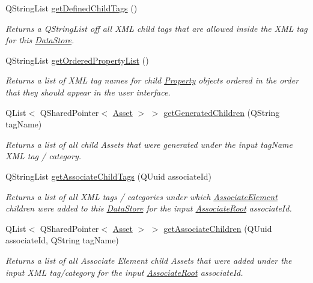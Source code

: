 \begin{DoxyCompactItemize}
Q\-String\-List \hyperlink{class_picto_1_1_data_store_a0f04316d9bbf1e07a737bd026556968e}{get\-Defined\-Child\-Tags} ()
\begin{DoxyCompactList}\small\item\em Returns a Q\-String\-List off all X\-M\-L child tags that are allowed inside the X\-M\-L tag for this \hyperlink{class_picto_1_1_data_store}{Data\-Store}. \end{DoxyCompactList}\item 
Q\-String\-List \hyperlink{class_picto_1_1_data_store_a6ead7a2e1b55e03cb3e5d14934962436}{get\-Ordered\-Property\-List} ()
\begin{DoxyCompactList}\small\item\em Returns a list of X\-M\-L tag names for child \hyperlink{class_picto_1_1_property}{Property} objects ordered in the order that they should appear in the user interface. \end{DoxyCompactList}\item 
Q\-List$<$ Q\-Shared\-Pointer$<$ \hyperlink{class_picto_1_1_asset}{Asset} $>$ $>$ \hyperlink{class_picto_1_1_data_store_ab7a53abb547d95df318bd9b47db1abf6}{get\-Generated\-Children} (Q\-String tag\-Name)
\begin{DoxyCompactList}\small\item\em Returns a list of all child Assets that were generated under the input tag\-Name X\-M\-L tag / category. \end{DoxyCompactList}\item 
Q\-String\-List \hyperlink{class_picto_1_1_data_store_a6f1853bb25faa31f63002d882e293173}{get\-Associate\-Child\-Tags} (Q\-Uuid associate\-Id)
\begin{DoxyCompactList}\small\item\em Returns a list of all X\-M\-L tags / categories under which \hyperlink{class_picto_1_1_associate_element}{Associate\-Element} children were added to this \hyperlink{class_picto_1_1_data_store}{Data\-Store} for the input \hyperlink{class_picto_1_1_associate_root}{Associate\-Root} associate\-Id. \end{DoxyCompactList}\item 
Q\-List$<$ Q\-Shared\-Pointer$<$ \hyperlink{class_picto_1_1_asset}{Asset} $>$ $>$ \hyperlink{class_picto_1_1_data_store_a8b9c70f5ab91278d774249654396b6bd}{get\-Associate\-Children} (Q\-Uuid associate\-Id, Q\-String tag\-Name)
\begin{DoxyCompactList}\small\item\em Returns a list of all Associate Element child Assets that were added under the input X\-M\-L tag/category for the input \hyperlink{class_picto_1_1_associate_root}{Associate\-Root} associate\-Id. \end{DoxyCompactList}\item 

\end{DoxyCompactItemize}
